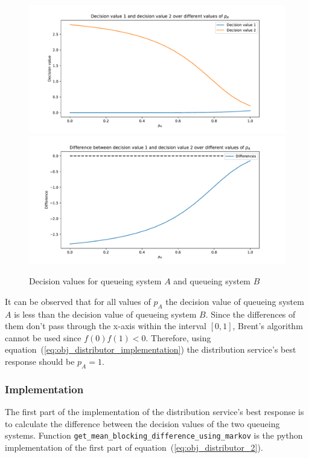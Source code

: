 \begin{figure}[H]
    \centering
    \includegraphics[width=\textwidth]{chapters/04_game_theoretic_model/img/brents_method/brent_method_special_case.pdf}
    \includegraphics[width=\textwidth]{chapters/04_game_theoretic_model/img/brents_method/brent_method_special_case_diffs.pdf}
    \caption{Decision values for queueing system \(A\) and queueing system \(B\)}
    \label{fig:brent_method_special_case}
\end{figure}

It can be observed that for all values of \(p_A\) the decision value of queueing
system \(A\) is less than the decision value of queueing system \(B\).
Since the differences of them don't pass through the x-axis within the interval
\([0,1]\), Brent's algorithm cannot be used since \(f(0)f(1) < 0\).
Therefore, using equation~(\ref{eq:obj_distributor_implementation}) the
distribution service's best response should be \(p_A = 1\).

\subsubsection{Implementation}

The first part of the implementation of the distribution service's best
response is to calculate the difference between the decision values of the two
queueing systems.
Function \lstinline[style=pystyle]{get_mean_blocking_difference_using_markov}
is the python implementation of the first part of
equation~(\ref{eq:obj_distributor_2}).

